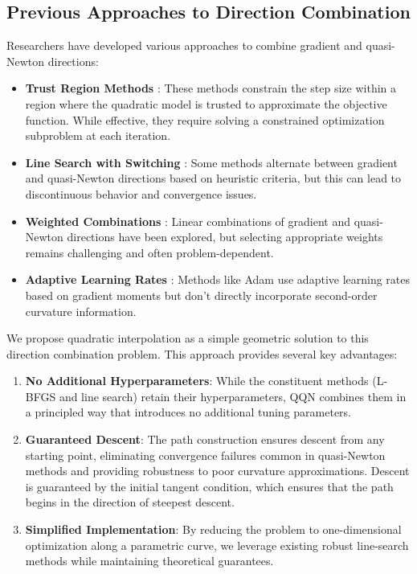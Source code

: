 \hypertarget{previous-approaches-to-direction-combination}{%
\subsection{Previous Approaches to Direction Combination}\label{previous-approaches-to-direction-combination}}

Researchers have developed various approaches to combine gradient and quasi-Newton directions:

\begin{itemize}
\tightlist
\item
  \textbf{Trust Region Methods} \citep{conn2000trust}: These methods constrain the step size within a region where the quadratic model is trusted to approximate the objective function. While effective, they require solving a constrained optimization subproblem at each iteration.
\item
  \textbf{Line Search with Switching} \citep{morales2000automatic}: Some methods alternate between gradient and quasi-Newton directions based on heuristic criteria, but this can lead to discontinuous behavior and convergence issues.
\item
  \textbf{Weighted Combinations} \citep{biggs1973minimization}: Linear combinations of gradient and quasi-Newton directions have been explored, but selecting appropriate weights remains challenging and often problem-dependent.
\item
  \textbf{Adaptive Learning Rates} \citep{kingma2015adam}: Methods like Adam use adaptive learning rates based on gradient moments but don't directly incorporate second-order curvature information.
\end{itemize}

We propose quadratic interpolation as a simple geometric solution to this direction combination problem.
This approach provides several key advantages:

\begin{enumerate}
\def\labelenumi{\arabic{enumi}.}
\item
  \textbf{No Additional Hyperparameters}: While the constituent methods (L-BFGS and line search) retain their hyperparameters, QQN combines them in a principled way that introduces no additional tuning parameters.
\item
  \textbf{Guaranteed Descent}: The path construction ensures descent from any starting point, eliminating convergence failures common in quasi-Newton methods and providing robustness to poor curvature approximations.
  Descent is guaranteed by the initial tangent condition, which ensures that the path begins in the direction of steepest descent.
\item
  \textbf{Simplified Implementation}: By reducing the problem to one-dimensional optimization along a parametric curve, we leverage existing robust line-search methods while maintaining theoretical guarantees.
\end{enumerate}

